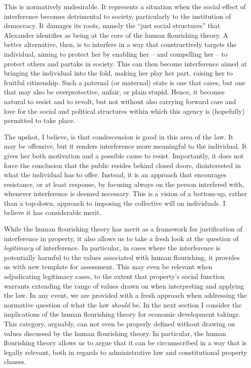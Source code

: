 This is normatively undesirable. It represents a situation when the social effect of interference becomes detrimental to society, particularly to the institution of democracy. It damages its roots, namely the ``just social structures'' that Alexander identifies as being at the core of the human flourishing theory. A better alternative, then, is to interfere in a way that constructively targets the individual, aiming to protect her by enabling her -- and compelling her -- to protect others and partake in society. This can then become interference aimed at bringing the individual into the fold, making her play her part, raising her to fruitful citizenship. Such a paternal (or maternal) state is one that cares, but one that may also be overprotective, unfair, or plain stupid. Hence, it becomes natural to resist and to revolt, but not without also carrying forward care and love for the social and political structures within which this agency is (hopefully) permitted to take place.

The upshot, I believe, is that condescension is good in this area of the law. It may be offensive, but it renders interference more meaningful to the individual. It gives her both motivation and a possible cause to resist. Importantly, it does not force the conclusion that the public resides behind closed doors, disinterested in what the individual has to offer. Instead, it is an approach that encourages resistance, or at least response, by focusing always on the person interfered with, whenever interference is deemed necessary. This is a vision of a bottom-up, rather than a top-down, approach to imposing the collective will on individuals. I believe it has considerable merit.

While the human flourishing theory has merit as a framework for justification of interference in property, it also allows us to take a fresh look at the question of {\it legitimacy} of interference. In particular, in cases where the interference is potentially harmful to the values associated with human flourishing, it provides us with new template for assessment. This may even be relevant when adjudicating legitimacy cases, to the extent that property's social function warrants extending the range of values drawn on when interpreting and applying the law. In any event, we are provided with a fresh approach when addressing the normative question of what the law {\it should} be. In the next section I consider the implications of the human flourishing theory for economic development takings. This category, arguably, can not even be properly defined without drawing on values discussed by the human flourishing theory. In particular, the human flourishing theory allows us to argue that it can be circumscribed in a way that is legally relevant, both in regards to administrative law and constitutional property clauses.



